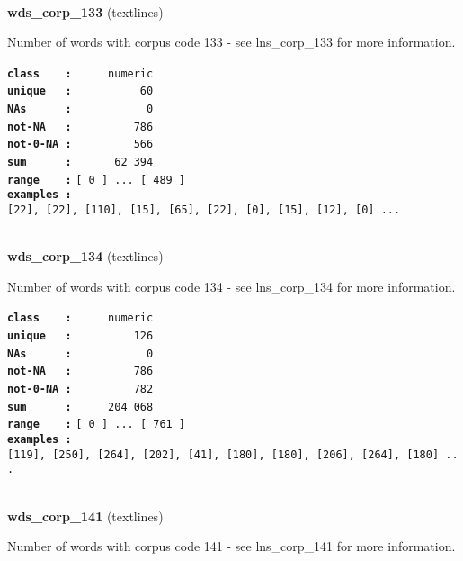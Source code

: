 \documentclass[]{article}
\begin{document}
~

\textbf{wds\_corp\_133} (textlines)

Number of words with corpus code 133 - see lns\_corp\_133 for more
information.

\textbf{\texttt{class\ \ \ \ :}} \texttt{~~~~~numeric}\\
\textbf{\texttt{unique\ \ \ :}} \texttt{~~~~~~~~~~60}\\
\textbf{\texttt{NAs\ \ \ \ \ \ :}} \texttt{~~~~~~~~~~~0}\\
\textbf{\texttt{not-NA\ \ \ :}} \texttt{~~~~~~~~~786}\\
\textbf{\texttt{not-0-NA\ :}} \texttt{~~~~~~~~~566}\\
\textbf{\texttt{sum\ \ \ \ \ \ :}} \texttt{~~~~~~62~394}\\
\textbf{\texttt{range\ \ \ \ :}}
\texttt{{[}\ 0\ {]}\ ...\ {[}\ 489\ {]}}\\
\textbf{\texttt{examples\ :}}
\texttt{{[}22{]},\ {[}22{]},\ {[}110{]},\ {[}15{]},\ {[}65{]},\ {[}22{]},\ {[}0{]},\ {[}15{]},\ {[}12{]},\ {[}0{]}\ ...}\\

~

\textbf{wds\_corp\_134} (textlines)

Number of words with corpus code 134 - see lns\_corp\_134 for more
information.

\textbf{\texttt{class\ \ \ \ :}} \texttt{~~~~~numeric}\\
\textbf{\texttt{unique\ \ \ :}} \texttt{~~~~~~~~~126}\\
\textbf{\texttt{NAs\ \ \ \ \ \ :}} \texttt{~~~~~~~~~~~0}\\
\textbf{\texttt{not-NA\ \ \ :}} \texttt{~~~~~~~~~786}\\
\textbf{\texttt{not-0-NA\ :}} \texttt{~~~~~~~~~782}\\
\textbf{\texttt{sum\ \ \ \ \ \ :}} \texttt{~~~~~204~068}\\
\textbf{\texttt{range\ \ \ \ :}}
\texttt{{[}\ 0\ {]}\ ...\ {[}\ 761\ {]}}\\
\textbf{\texttt{examples\ :}}
\texttt{{[}119{]},\ {[}250{]},\ {[}264{]},\ {[}202{]},\ {[}41{]},\ {[}180{]},\ {[}180{]},\ {[}206{]},\ {[}264{]},\ {[}180{]}\ ...}\\

~

\textbf{wds\_corp\_141} (textlines)

Number of words with corpus code 141 - see lns\_corp\_141 for more
information.
\end{document}
